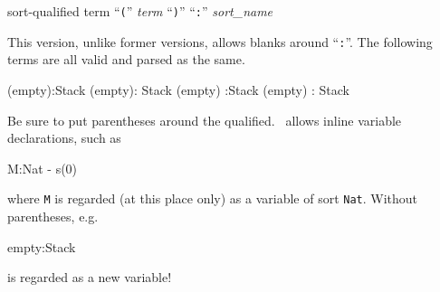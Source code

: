 \documentclass[a4paper]{memoir}
\begin{document}
\begin{bsyntax} sort-qualified term \Hline
``\texttt{(}'' \textit{term} ``\texttt{)}'' ``\texttt{:}'' \textit{sort\_name}
\end{bsyntax}

\begin{warning}
  This version, unlike former versions, allows blanks around ``\texttt{:}''.
  The following terms are all valid and parsed as the same.
  \begin{vvtm}
  \begin{ccode}
    (empty):Stack
    (empty): Stack
    (empty) :Stack
    (empty) : Stack
  \end{ccode}
  \end{vvtm}
\end{warning}

\begin{warning}
  Be sure to put parentheses around the qualified. \cafeobj~allows
  inline variable declarations, such as
  \begin{vvtm}
  \begin{ccode}
    M:Nat - s(0)
  \end{ccode}
  \end{vvtm}
  where \verb|M| is regarded (at this place only) as a variable of
  sort \verb|Nat|. Without parentheses, e.g.
  \begin{vvtm}
  \begin{ccode}
    empty:Stack
  \end{ccode}
  \end{vvtm}
  is regarded as a new variable!
\end{warning}
\end{document}
